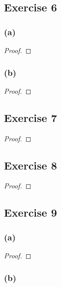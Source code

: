 \documentclass[14pt]{extarticle}
\begin{document}
\subsection{Exercise 6}

\subsubsection{(a)}

\begin{proof}

\end{proof}

\subsubsection{(b)}

\begin{proof}

\end{proof}

\subsection{Exercise 7}

\begin{proof}

\end{proof}

\subsection{Exercise 8}

\begin{proof}

\end{proof}

\subsection{Exercise 9}

\subsubsection{(a)}

\begin{proof}

\end{proof}

\subsubsection{(b)}
\end{document}
